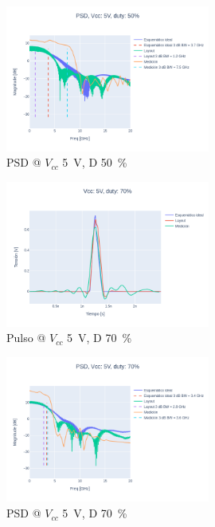 \begin{figure}
  \centering
    \includegraphics[width=0.6\textwidth]{images/plots/Vcc_5V_duty_50_psd.png}
    \caption{PSD @ $V_{cc}$ \qty{5}{\volt}, D \qty{50}{\percent} }
    \label{fig:psd_5v_50}
\end{figure}

\begin{figure}
  \centering
    \includegraphics[width=0.6\textwidth]{images/plots/Vcc_5V_duty_70_time_domain.png}
    \caption{Pulso @ $V_{cc}$ \qty{5}{\volt}, D \qty{70}{\percent} }
    \label{fig:plots_5v_70}
\end{figure}

\begin{figure}
  \centering
    \includegraphics[width=0.6\textwidth]{images/plots/Vcc_5V_duty_70_psd.png}
    \caption{PSD @ $V_{cc}$ \qty{5}{\volt}, D \qty{70}{\percent} }
    \label{fig:psd_5v_70}
\end{figure}

